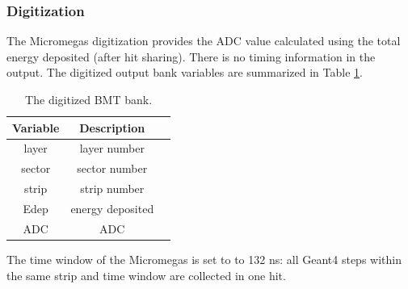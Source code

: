 \subsubsection{Digitization}

The Micromegas digitization provides the ADC value calculated using the total energy deposited (after hit sharing).
There is no timing information in the output.
The digitized output bank variables are summarized in Table \ref{tab:mmBank}.

\begin{table}[h]
	\begin{center}
		\begin{tabular}{| c | c | c |}
			\hline \hline
			Variable & Description  \\
			\hline
              layer  &      layer number   \\
             sector  &     sector number   \\
              strip  &      strip number   \\
               Edep  &  energy deposited   \\
                ADC  &               ADC   \\
			\hline \hline
		\end{tabular}
	\end{center}
	\caption{The digitized BMT bank.}\label{tab:mmBank}
\end{table}

The time window  of the Micromegas is set to to 132 ns: all Geant4 steps within the same strip and time window are collected in one hit.

